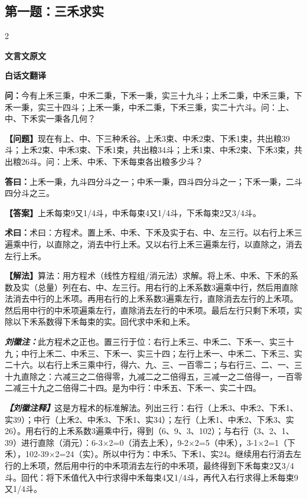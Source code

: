 \documentclass[10pt,a4paper]{article}
\newcommand{\wen}[1]{\textbf{\color{problemcolor}问：}#1\par}
\newcommand{\da}[1]{\textbf{答曰：}#1\par}
\newcommand{\shu}[1]{\textbf{术曰：}#1\par}
\newcommand{\liuhui}[1]{{\color{commentarycolor}\textit{\textbf{刘徽注：}}#1\par}}
\newcommand{\classicalheader}[1]{{\centering\large\bfseries\color{classicalcolor} #1\par\vspace{0.5em}}}
\newcommand{\wenmodern}[1]{\textbf{\color{moderncolor}【问题】}#1\par}
\newcommand{\damodern}[1]{\textbf{【答案】}#1\par}
\newcommand{\shumodern}[1]{\textbf{【解法】}#1\par}
\newcommand{\liuhuimodern}[1]{{\color{commentarycolor}\textit{\textbf{【刘徽注释】}}#1\par}}
\newcommand{\modernheader}[1]{{\centering\large\bfseries\color{moderncolor} #1\par\vspace{0.5em}}}
\newcommand{\problemsec}[1]{\subsection*{#1}}
\begin{document}
\vspace{0.5cm}


\problemsec{第一题：三禾求实}
\begin{paracol}{2}
\classicalheader{文言文原文}
\switchcolumn
\modernheader{白话文翻译}
\switchcolumn*

\wen{今有上禾三秉，中禾二秉，下禾一秉，实三十九斗；上禾二秉，中禾三秉，下禾一秉，实三十四斗；上禾一秉，中禾二秉，下禾三秉，实二十六斗。问：上、中、下禾实一秉各几何？}

\switchcolumn

\wenmodern{现在有上、中、下三种禾谷。上禾3束、中禾2束、下禾1束，共出粮39斗；上禾2束、中禾3束、下禾1束，共出粮34斗；上禾1束、中禾2束、下禾3束，共出粮26斗。问：上禾、中禾、下禾每束各出粮多少斗？}

\switchcolumn*

\da{上禾一秉，九斗四分斗之一；中禾一秉，四斗四分斗之一；下禾一秉，二斗四分斗之三。}

\switchcolumn

\damodern{上禾每束9又1/4斗，中禾每束4又1/4斗，下禾每束2又3/4斗。}

\switchcolumn*

\shu{术曰：方程术。置上禾、中禾、下禾及实于右、中、左三行。以右行上禾三遍乘中行，以直除之，消去中行上禾。又以右行上禾三遍乘左行，以直除之，消去左行上禾。}

\switchcolumn

\shumodern{算法：用方程术（线性方程组/消元法）求解。将上禾、中禾、下禾的系数及实（总量）列在右、中、左三行。用右行的上禾系数3遍乘中行，然后用直除法消去中行的上禾项。再用右行的上禾系数3遍乘左行，直除消去左行的上禾项。然后用中行的中禾项遍乘左行，直除消去左行的中禾项。最后左行只剩下禾项，实除以下禾系数得下禾每束的实。回代求中禾和上禾。}

\switchcolumn*

\liuhui{此方程术之正也。置三行于位：右行上禾三、中禾二、下禾一、实三十九；中行上禾二、中禾三、下禾一、实三十四；左行上禾一、中禾二、下禾三、实二十六。以右行上禾三乘中行，得六、九、三、一百零二；与右行三、二、一、三十九直除之：六减三之二倍得零，九减二之二倍得五，三减一之二倍得一，一百零二减三十九之二倍得二十四。是为中行：中禾五、下禾一、实二十四。}

\switchcolumn

\liuhuimodern{这是方程术的标准解法。列出三行：右行（上禾3、中禾2、下禾1、实39）；中行（上禾2、中禾3、下禾1、实34）；左行（上禾1、中禾2、下禾3、实26）。用右行的上禾系数3遍乘中行，得到（6、9、3、102）；与右行（3、2、1、39）进行直除（消元）：6-3×2=0（消去上禾），9-2×2=5（中禾），3-1×2=1（下禾），102-39×2=24（实）。所以中行为：中禾5、下禾1、实24。继续用右行消去左行的上禾项，然后用中行的中禾项消去左行的中禾项，最终得到下禾每束2又3/4斗。回代：将下禾值代入中行求得中禾每束4又1/4斗，再代入右行求得上禾每束9又1/4斗。}

\end{paracol}
\end{document}
